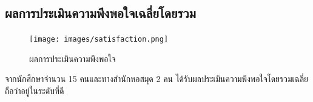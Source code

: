 \subsection{ผลการประเมินความพึงพอใจเฉลี่ยโดยรวม}
\begin{figure}[ht]
    \centering
    \texttt{[image: images/satisfaction.png]}
    \caption[satisfaction]{ผลการประเมินความพึงพอใจ}
    \label{fig:satisfaction}
\end{figure}
จากนักศึกษาจำนวน 15 คนและทางสำนักหอสมุด 2 คน ได้รับผลประเมินความพึงพอใจโดยรวมเฉลี่ยถือว่าอยู่ในระดับที่ดี



